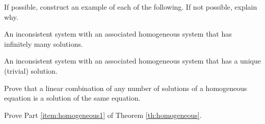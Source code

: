 \documentclass{ximera}
\begin{document}
\begin{problem} If possible, construct an example of each of the following.  If not possible, explain why.
  \begin{problem}\label{prob:homexample1}
  An inconsistent system with an associated homogeneous system that has infinitely many solutions.
  \end{problem}
  \begin{problem}\label{prob:homexample2}
  An inconsistent system with an associated homogeneous system that has a unique (trivial) solution.
  \end{problem}
\end{problem}

\begin{problem}\label{prob:lincombsolutions}
Prove that a linear combination of any number of solutions of a homogeneous equation is a solution of the same equation.
\end{problem}

\begin{problem}\label{prob:homogeneouspart1} Prove Part \ref{item:homogeneous1} of Theorem \ref{th:homogeneous}.
\end{problem}
\end{document}
